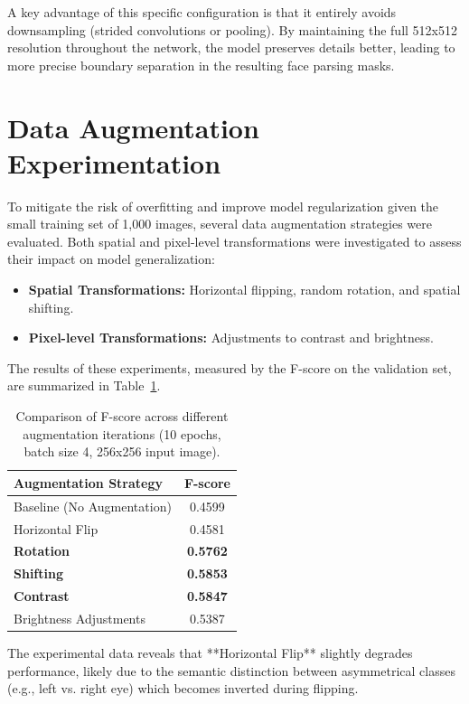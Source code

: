 \documentclass[10pt, a4paper]{article} %
\begin{document}
A key advantage of this specific configuration is that it entirely avoids downsampling (strided convolutions or pooling). By maintaining the full 512x512 resolution throughout the network, the model preserves details better, leading to more precise boundary separation in the resulting face parsing masks.

\section{Data Augmentation Experimentation}

To mitigate the risk of overfitting and improve model regularization given the small training set of 1,000 images, several data augmentation strategies were evaluated. Both spatial and pixel-level transformations were investigated to assess their impact on model generalization:

\begin{itemize}
    \item \textbf{Spatial Transformations:} Horizontal flipping, random rotation, and spatial shifting.
    \item \textbf{Pixel-level Transformations:} Adjustments to contrast and brightness.
\end{itemize}

The results of these experiments, measured by the F-score on the validation set, are summarized in Table~\ref{tab:augmentation}.

\begin{table}[h]
\centering
\caption{Comparison of F-score across different augmentation iterations (10 epochs, batch size 4, 256x256 input image).}
\label{tab:augmentation}
\begin{tabular}{@{}lc@{}}
\toprule
Augmentation Strategy & F-score \\ \midrule
Baseline (No Augmentation) & 0.4599 \\
Horizontal Flip & 0.4581 \\
\textbf{Rotation} & \textbf{0.5762} \\
\textbf{Shifting} & \textbf{0.5853} \\
\textbf{Contrast} & \textbf{0.5847} \\ 
Brightness Adjustments & 0.5387 \\ \bottomrule
\end{tabular}
\end{table}

The experimental data reveals that **Horizontal Flip** slightly degrades performance, likely due to the semantic distinction between asymmetrical classes (e.g., left vs. right eye) which becomes inverted during flipping. 
\end{document}
